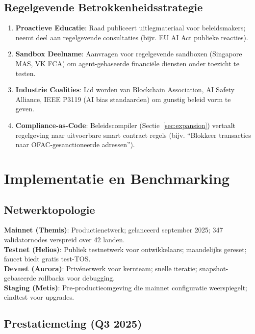 \documentclass[11pt]{article}
\begin{document}
\subsection{Regelgevende Betrokkenheidsstrategie}

\begin{enumerate}[noitemsep]
  \item \textbf{Proactieve Educatie}: Raad publiceert uitlegmateriaal voor beleidsmakers; neemt deel aan regelgevende consultaties (bijv. EU AI Act publieke reacties).
  \item \textbf{Sandbox Deelname}: Aanvragen voor regelgevende sandboxen (Singapore MAS, VK FCA) om agent-gebaseerde financiële diensten onder toezicht te testen.
  \item \textbf{Industrie Coalities}: Lid worden van Blockchain Association, AI Safety Alliance, IEEE P3119 (AI bias standaarden) om gunstig beleid vorm te geven.
  \item \textbf{Compliance-as-Code}: Beleidscompiler (Sectie~\ref{sec:expansion}) vertaalt regelgeving naar uitvoerbare smart contract regels (bijv. ``Blokkeer transacties naar OFAC-gesanctioneerde adressen'').
\end{enumerate}

\section{Implementatie en Benchmarking}
\label{sec:implementation}

\subsection{Netwerktopologie}

\textbf{Mainnet (Themis)}: Productienetwerk; gelanceerd september 2025; 347 validatornodes verspreid over 42 landen.\\
\textbf{Testnet (Helios)}: Publiek testnetwerk voor ontwikkelaars; maandelijks gereset; faucet biedt gratis test-TOS.\\
\textbf{Devnet (Aurora)}: Privénetwerk voor kernteam; snelle iteratie; snapshot-gebaseerde rollbacks voor debugging.\\
\textbf{Staging (Metis)}: Pre-productieomgeving die mainnet configuratie weerspiegelt; eindtest voor upgrades.

\subsection{Prestatiemeting (Q3 2025)}
\end{document}
